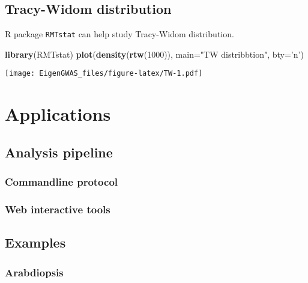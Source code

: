 \documentclass[]{book}
\newenvironment{Shaded}{\begin{snugshade}}{\end{snugshade}}
\newcommand{\DataTypeTok}[1]{\textcolor[rgb]{0.13,0.29,0.53}{#1}}
\newcommand{\DecValTok}[1]{\textcolor[rgb]{0.00,0.00,0.81}{#1}}
\newcommand{\KeywordTok}[1]{\textcolor[rgb]{0.13,0.29,0.53}{\textbf{#1}}}
\newcommand{\NormalTok}[1]{#1}
\newcommand{\StringTok}[1]{\textcolor[rgb]{0.31,0.60,0.02}{#1}}
\begin{document}
\hypertarget{tracy-widom-distribution}{%
\section{Tracy-Widom distribution}\label{tracy-widom-distribution}}

R package \texttt{RMTstat} can help study Tracy-Widom distribution.

\begin{Shaded}
\begin{Highlighting}[]
\KeywordTok{library}\NormalTok{(RMTstat)}
\KeywordTok{plot}\NormalTok{(}\KeywordTok{density}\NormalTok{(}\KeywordTok{rtw}\NormalTok{(}\DecValTok{1000}\NormalTok{)), }\DataTypeTok{main=}\StringTok{"TW distribbtion"}\NormalTok{, }\DataTypeTok{bty=}\StringTok{'n'}\NormalTok{)}
\end{Highlighting}
\end{Shaded}

\texttt{[image: EigenGWAS\_files/figure-latex/TW-1.pdf]}

\hypertarget{applications}{%
\chapter{Applications}\label{applications}}

\hypertarget{analysis-pipeline}{%
\section{Analysis pipeline}\label{analysis-pipeline}}

\hypertarget{commandline-protocol}{%
\subsection{Commandline protocol}\label{commandline-protocol}}

\hypertarget{web-interactive-tools}{%
\subsection{Web interactive tools}\label{web-interactive-tools}}

\hypertarget{examples}{%
\section{Examples}\label{examples}}

\hypertarget{arabdiopsis}{%
\subsection{Arabdiopsis}\label{arabdiopsis}}
\end{document}
